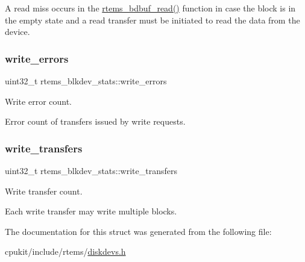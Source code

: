 A read miss occurs in the \mbox{\hyperlink{group__rtems__bdbuf_ga8546cefc842eef10cdb5b38a6cead9f7}{rtems\+\_\+bdbuf\+\_\+read()}} function in case the block is in the empty state and a read transfer must be initiated to read the data from the device. \mbox{\label{structrtems__blkdev__stats_a4f17a197977cd525e17e016552c25df2}} 
\subsubsection{\texorpdfstring{write\_errors}{write\_errors}}
{\footnotesize\ttfamily uint32\+\_\+t rtems\+\_\+blkdev\+\_\+stats\+::write\+\_\+errors}



Write error count. 

Error count of transfers issued by write requests. \mbox{\label{structrtems__blkdev__stats_adea23113b39172399f630b5a52c1b054}} 
\subsubsection{\texorpdfstring{write\_transfers}{write\_transfers}}
{\footnotesize\ttfamily uint32\+\_\+t rtems\+\_\+blkdev\+\_\+stats\+::write\+\_\+transfers}



Write transfer count. 

Each write transfer may write multiple blocks. 

The documentation for this struct was generated from the following file\+:\begin{DoxyCompactItemize}
\item 
cpukit/include/rtems/\mbox{\hyperlink{diskdevs_8h}{diskdevs.\+h}}\end{DoxyCompactItemize}

